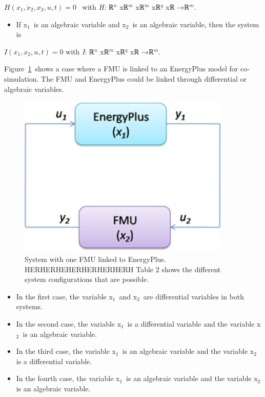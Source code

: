 \(H\left(x_1,\dot x_2,x_2,u,t\right) = 0\) ~with \emph{H:} ℝ\(^{n}\) xℝ\(^{m}\) xℝ\(^{m}\) xℝ\(^{q}\) xℝ →ℝ\(^{m}\).

\begin{itemize}
\tightlist
\item
  If x\(_{1}\)~is an algebraic variable and x\(_{2}\)~is an algebraic variable, then the system is
\end{itemize}

\(I\left(x_1,x_2,u,t\right) = 0\) with \emph{I}: ℝ\(^{n}\) xℝ\(^{m}\) xℝ\(^{q}\) xℝ →ℝ\(^{m}\).

Figure~\ref{fig:system-with-one-fmu-linked-to-energyplus.}~shows a case where a FMU is linked to an EnergyPlus model for co-simulation. The FMU and EnergyPlus could be linked through differential or algebraic variables.

\begin{figure}[hbtp] %
\centering
\includegraphics[width=0.9\textwidth, height=0.9\textheight, keepaspectratio=true]{media/image016.png}
\caption{System with one FMU linked to EnergyPlus. HERHERHEHERHERHERHERH Table 2 shows the different system configurations that are possible. \protect \label{fig:system-with-one-fmu-linked-to-energyplus.}}
\end{figure}

\begin{itemize}
\item
  In the first case, the variable x\(_{1}\)~and x\(_{2}\)~are differential variables in both systems.
\item
  In the second case, the variable x\(_{1}\)~is a differential variable and the variable x\(_{2}\)~is an algebraic variable.
\item
  In the third case, the variable x\(_{1}\)~is an algebraic variable and the variable x\(_{2}\) is a differential variable.
\item
  In the fourth case, the variable x\(_{1}\)~is an algebraic variable and the variable x\(_{2}\) is an algebraic variable.
\end{itemize}

